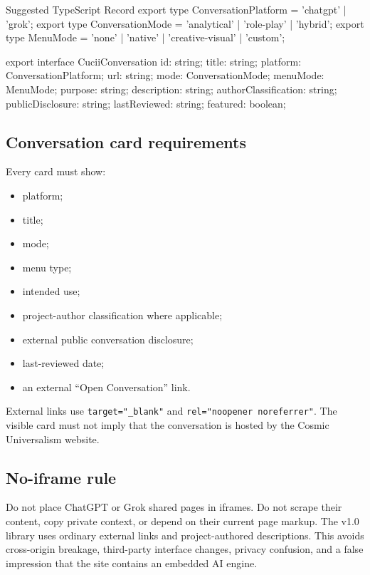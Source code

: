 \documentclass[11pt,letterpaper]{article}
\begin{document}
\begin{codebox}{Suggested TypeScript Record}
export type ConversationPlatform = 'chatgpt' | 'grok';
export type ConversationMode = 'analytical' | 'role-play' | 'hybrid';
export type MenuMode = 'none' | 'native' | 'creative-visual' | 'custom';

export interface CuciiConversation {
  id: string;
  title: string;
  platform: ConversationPlatform;
  url: string;
  mode: ConversationMode;
  menuMode: MenuMode;
  purpose: string;
  description: string;
  authorClassification: string;
  publicDisclosure: string;
  lastReviewed: string;
  featured: boolean;
}
\end{codebox}

\subsection{Conversation card requirements}

Every card must show:

\begin{itemize}
    \item platform;
    \item title;
    \item mode;
    \item menu type;
    \item intended use;
    \item project-author classification where applicable;
    \item external public conversation disclosure;
    \item last-reviewed date;
    \item an external ``Open Conversation'' link.
\end{itemize}

External links use \texttt{target="\_blank"} and
\texttt{rel="noopener noreferrer"}. The visible card must not imply that the
conversation is hosted by the Cosmic Universalism website.

\subsection{No-iframe rule}

\begin{safetybox}
Do not place ChatGPT or Grok shared pages in iframes. Do not scrape their content,
copy private context, or depend on their current page markup. The v1.0 library
uses ordinary external links and project-authored descriptions. This avoids
cross-origin breakage, third-party interface changes, privacy confusion, and a
false impression that the site contains an embedded AI engine.
\end{safetybox}
\end{document}
